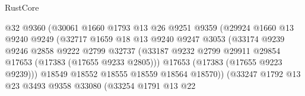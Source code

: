 \begin{lexlean}{RustCore}
\begin{coremodule}
                                    @32
                                    @9360
                                    (@30061
                                      @1660
                                      @1793
                                      @13
                                      @26
                                      @9251
                                      @9359
                                      (@29924
                                        @1660
                                        @13
                                        @9240
                                        @9249
                                        (@32717
                                          @1659
                                          @18
                                          @13
                                          @9240
                                          @9247
                                          @3053
                                          (@33174
                                            @9239
                                            @9246
                                            @2858
                                            @9222
                                            @2799
                                            @32737
                                            (@33187
                                              @9232
                                              @2799
                                              @29911
                                              @29854
                                              @17653
                                              (@17383 (@17655 @9233 @2805)))
                                            @17653
                                            (@17383 (@17655 @9223 @9239)))
                                          @18549
                                          @18552
                                          @18555
                                          @18559
                                          @18564
                                          @18570))
                                      (@33247
                                        @1792
                                        @13
                                        @23
                                        @3493
                                        @9358
                                        @33080
                                        (@33254
                                          @1791
                                          @13
                                          @22

\end{coremodule}
\end{lexlean}

